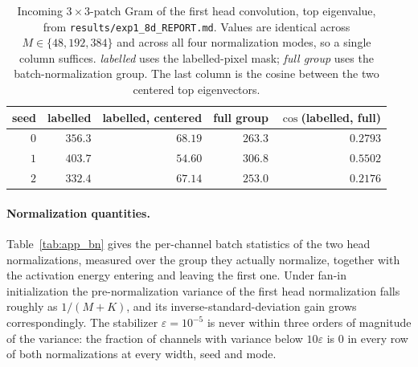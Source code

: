 \begin{table}[htbp]
\centering
\small
\caption{Incoming $3\times3$-patch Gram of the first head convolution, top
eigenvalue, from \texttt{results/exp1\_8d\_REPORT.md}. Values are identical
across $M \in \{48, 192, 384\}$ and across all four normalization modes, so a
single column suffices. \emph{labelled} uses the labelled-pixel mask;
\emph{full group} uses the batch-normalization group. The last column is the
cosine between the two centered top eigenvectors.}
\label{tab:app_gram}
\begin{tabular}{rrrrr}
\toprule
seed & labelled & labelled, centered & full group & $\cos$(labelled, full) \\
\midrule
$0$ & $356.3$ & $68.19$ & $263.3$ & $0.2793$ \\
$1$ & $403.7$ & $54.60$ & $306.8$ & $0.5502$ \\
$2$ & $332.4$ & $67.14$ & $253.0$ & $0.2176$ \\
\bottomrule
\end{tabular}
\end{table}

\paragraph{Normalization quantities.} Table~\ref{tab:app_bn} gives the
per-channel batch statistics of the two head normalizations, measured over the
group they actually normalize, together with the activation energy entering and
leaving the first one. Under fan-in initialization the pre-normalization
variance of the first head normalization falls roughly as $1/(M+K)$, and its
inverse-standard-deviation gain grows correspondingly. The stabilizer
$\varepsilon = 10^{-5}$ is never within three orders of magnitude of the
variance: the fraction of channels with variance below $10\varepsilon$ is $0$
in every row of both normalizations at every width, seed and mode.


